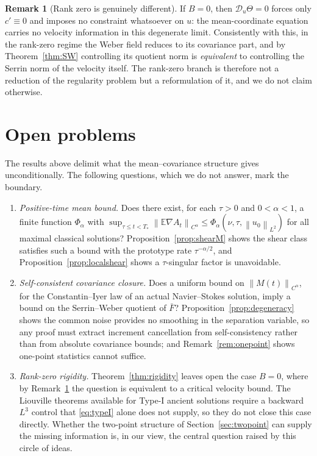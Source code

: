 \documentclass[11pt,reqno]{amsart}
\newcommand{\E}{\mathbb{E}}
\newcommand{\norm}[1]{\left\lVert #1\right\rVert}
\theoremstyle{definition}
\newtheorem{remark}[theorem]{Remark}
\begin{document}
\begin{remark}[Rank zero is genuinely different]\label{rem:rankzero}
If $B=0$, then $\mathcal D_u\Theta=0$ forces only $c'\equiv0$ and imposes no constraint
whatsoever on $u$: the mean-coordinate equation carries no velocity information in this
degenerate limit. Consistently with this, in the rank-zero regime the Weber field reduces
to its covariance part, and by Theorem~\ref{thm:SW} controlling its quotient norm is
\emph{equivalent} to controlling the Serrin norm of the velocity itself. The rank-zero
branch is therefore not a reduction of the regularity problem but a reformulation of it,
and we do not claim otherwise.
\end{remark}

\section{Open problems}\label{sec:further}

The results above delimit what the mean--covariance structure gives unconditionally. The
following questions, which we do not answer, mark the boundary.

\begin{enumerate}
\item[(i)] \emph{Positive-time mean bound.} Does there exist, for each $\tau>0$ and
$0<\alpha<1$, a finite function $\Phi_\alpha$ with
$\sup_{\tau\le t<T_*}\norm{\E\nabla A_t}_{C^\alpha}
\le\Phi_\alpha(\nu,\tau,\norm{u_0}_{L^2})$ for all maximal classical solutions?
Proposition~\ref{prop:shearM} shows the shear class satisfies such a bound with the
prototype rate $\tau^{-\alpha/2}$, and Proposition~\ref{prop:localshear} shows a
$\tau$-singular factor is unavoidable.
\item[(ii)] \emph{Self-consistent covariance closure.} Does a uniform bound on
$\norm{M(t)}_{C^\alpha}$, for the Constantin--Iyer law of an actual Navier--Stokes
solution, imply a bound on the Serrin--Weber quotient of $\bar F$?
Proposition~\ref{prop:degeneracy} shows the common noise provides no smoothing in the
separation variable, so any proof must extract increment cancellation from
self-consistency rather than from absolute covariance bounds; and
Remark~\ref{rem:onepoint} shows one-point statistics cannot suffice.
\item[(iii)] \emph{Rank-zero rigidity.} Theorem~\ref{thm:rigidity} leaves open the case
$B=0$, where by Remark~\ref{rem:rankzero} the question is equivalent to a critical
velocity bound. The Liouville theorems available for Type-I ancient solutions
\cite{AlbrittonBarker2019} require a backward $L^3$ control that \eqref{eq:typeI} alone
does not supply, so they do not close this case directly. Whether the two-point structure
of Section~\ref{sec:twopoint} can supply the missing information is, in our view, the
central question raised by this circle of ideas.
\end{enumerate}
\end{document}
